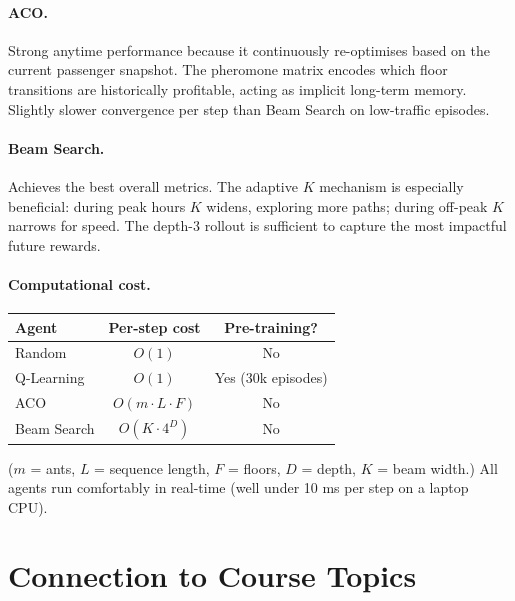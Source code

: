 \documentclass[12pt,a4paper]{article}
\begin{document}
\paragraph{ACO.}
Strong anytime performance because it continuously re-optimises based on the
current passenger snapshot.  The pheromone matrix encodes which floor transitions
are historically profitable, acting as implicit long-term memory.
Slightly slower convergence per step than Beam Search on low-traffic episodes.

\paragraph{Beam Search.}
Achieves the best overall metrics.  The adaptive $K$ mechanism is especially
beneficial: during peak hours $K$ widens, exploring more paths; during off-peak
$K$ narrows for speed.  The depth-3 rollout is sufficient to capture the
most impactful future rewards.

\paragraph{Computational cost.}
\begin{center}
\begin{tabular}{lcc}
\toprule
\textbf{Agent} & \textbf{Per-step cost} & \textbf{Pre-training?} \\
\midrule
Random      & $O(1)$       & No  \\
Q-Learning  & $O(1)$       & Yes (30k episodes) \\
ACO         & $O(m \cdot L \cdot F)$ & No \\
Beam Search & $O(K \cdot 4^D)$ & No \\
\bottomrule
\end{tabular}
\end{center}

($m$ = ants, $L$ = sequence length, $F$ = floors, $D$ = depth, $K$ = beam width.)
All agents run comfortably in real-time (well under 10 ms per step on a laptop CPU).

\section{Connection to Course Topics}
\end{document}
